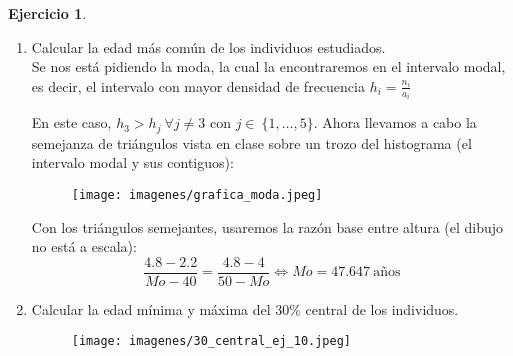 \documentclass[a4paper, 12pt]{article}
\theoremstyle{definition}
\newtheorem{ej}{Ejercicio}
\begin{document}
\begin{ej}
\begin{enumerate}[label=\textit{\alph*)}]
    \item Calcular la edad más común de los individuos estudiados. \\
    Se nos está pidiendo la moda, la cual la encontraremos en el intervalo modal, es decir, el intervalo con mayor densidad de frecuencia $h_{i} = \frac{n_i}{a_i}$

 En este caso, $h_{3} > h_{j} \ \forall j \not = 3$ con $j \in \ \{1,\dots,5\}$. Ahora llevamos a cabo la semejanza de triángulos vista en clase sobre un trozo del histograma (el intervalo modal y sus contiguos): \\
    
    \begin{figure}[h!]
    \centering
    \texttt{[image: imagenes/grafica\_moda.jpeg]}
	\end{figure}
	
    Con los triángulos semejantes, usaremos la razón base entre altura (el dibujo no está a escala): \\
    $$\frac{4.8-2.2}{Mo - 40} = \frac{4.8 - 4}{50 - Mo} \Longleftrightarrow Mo= 47.647 \ \text{años} $$
    \item Calcular la edad mínima y máxima del 30\% central de los individuos.\\
    
    \begin{figure}[h!]
    \centering
    \texttt{[image: imagenes/30\_central\_ej\_10.jpeg]}
	\end{figure}


\end{enumerate}
\end{ej}
\end{document}
